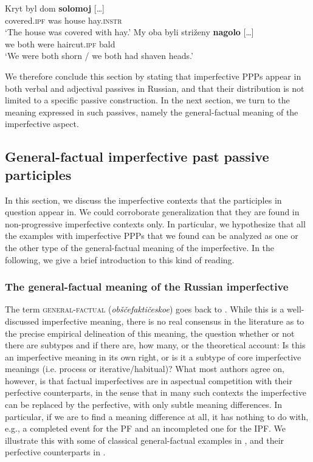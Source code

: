 \documentclass[output=paper,modfonts,newtxmath,hidelinks
]{langscibook}
\begin{document}
\ea\label{kryt}
\ea\gll 	Kryt byl dom \textbf{solomoj} [\dots]\\ 		
	covered.\textsc{ipf} was house hay.\textsc{instr} 	\\
\glt	`The house was covered with hay.'\label{kryta}
\ex\gll	My oba byli striženy \textbf{nagolo} [\dots]\\
	we both were haircut.\textsc{ipf} bald\\
\glt	`We were both shorn / we both had shaven heads.'\label{nagolo} 
\z\z

\noindent We therefore conclude this section by stating that imperfective PPPs appear in both verbal and adjectival passives in Russian, and that their distribution is not limited to a specific passive construction. In the next section, we turn to the meaning expressed in such passives, namely the general-factual meaning of the imperfective aspect.

\subsection{General-factual imperfective past passive participles} 
\label{whichIPF}

In this section, we discuss the imperfective contexts that the participles in question appear in. We could corroborate  generalization that they are found in non-progressive imperfective contexts only. In particular, we hypothesize that all the examples with imperfective PPPs that we found can be analyzed as one or the other type of the general-factual meaning of the imperfective. In the following, we give a brief introduction to this kind of reading.

\subsubsection{The general-factual meaning of the Russian imperfective}
\label{OF}

The term \textsc{general-factual} (\textit{obščefaktičeskoe}) goes back to \citet{maslov59} \citep[for recent discussion see][]{mehlig16}. While this is a well-discussed imperfective meaning, there is no real consensus in the literature \citep[see][chapter 4 for an overview and references]{gronndiss} as to the precise empirical delineation of this meaning, the question whether or not there are subtypes and if there are, how many, or the theoretical account: Is this an imperfective meaning in its own right, or is it a subtype of core imperfective meanings (i.e. process or iterative/habitual)? What most authors agree on, however, is that factual imperfectives are in aspectual competition with their perfective counterparts, in the sense that in many such contexts the imperfective can be replaced by the perfective, with only subtle meaning differences. In particular, if we are to find a meaning difference at all, it has nothing to do with, e.g., a completed event for the PF and an incompleted one for the IPF. We illustrate this with some of  classical general-factual examples in , and their perfective counterparts in . 
\end{document}
